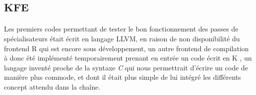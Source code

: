 \subsection{KFE}
\paragraph{}
Les premiers codes permettant de tester le bon fonctionnement des passes de
spécialisateurs était écrit en langage LLVM, en raison de non disponibilité du
frontend R qui est encore sous développement, un autre frontend de compilation à
donc été implémenté temporairement prenant en entrée un code écrit en \og{} K
\fg{}, un langage inventé proche de la syntaxe \emph{C} qui nous permettrait
d'écrire un code de manière plus commode, et dont il était plus simple de lui
intégré les différents concept attendu dans la chaîne.
